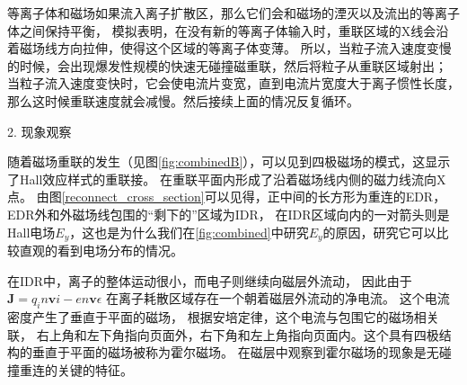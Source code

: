 等离子体和磁场如果流入离子扩散区，那么它们会和磁场的湮灭以及流出的等离子体之间保持平衡，
模拟表明\cite{10.1063/1.1597494}，在没有新的等离子体输入时，重联区域的X线会沿着磁场线方向拉伸，使得这个区域的等离子体变薄。
所以，当粒子流入速度变慢的时候，会出现爆发性规模的快速无碰撞磁重联，然后将粒子从重联区域射出；
当粒子流入速度变快时，它会使电流片变宽，直到电流片宽度大于离子惯性长度，那么这时候重联速度就会减慢。然后接续上面的情况反复循环。
\begin{comment}
    由Syrovatskii的数值模拟结果表明\cite{1981ARA&A..19..163S, TREUMANN2006101}，在这种情况下的电流片相对于一般的重联状况是稳定的，且不受Hall效应的影响。因此，
Hall效应对等离子体磁重联的重要性只取决于电流片的宽度，在电流片宽度$d\simeq \lambda_i$的电流片中才会出现Hall效应的重联。
\end{comment}

2. 现象观察

随着磁场重联的发生（见图\ref{fig:combinedB}），可以见到四极磁场的模式\cite{TREUMANN2006101,Yi_2018}，这显示了Hall效应样式的重联接。
在重联平面内形成了沿着磁场线内侧的磁力线流向X点。
由图\ref{reconnect_cross_section}可以见得，正中间的长方形为重连的EDR，EDR外和外磁场线包围的“剩下的”区域为IDR，
在IDR区域向内的一对箭头则是Hall电场$E_y$，这也是为什么我们在\ref{fig:combined}中研究$E_y$的原因，研究它可以比较直观的看到电场分布的情况。

在IDR中，离子的整体运动很小，而电子则继续向磁层外流动，
因此由于 $\mathbf{J}=q_in\mathbf{v}i-en\mathbf{v}\epsilon$ 在离子耗散区域存在一个朝着磁层外流动的净电流。
这个电流密度产生了垂直于平面的磁场\cite{https://doi.org/10.1029/JA084iA02p00399}，
根据安培定律，这个电流与包围它的磁场相关联，
右上角和左下角指向页面外，右下角和左上角指向页面内。这个具有四极结构的垂直于平面的磁场被称为霍尔磁场。
在磁层中观察到霍尔磁场的现象是无碰撞重连的关键的特征。


